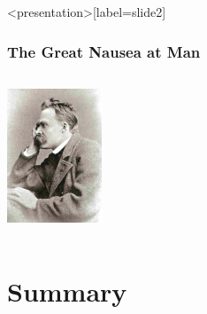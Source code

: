 \begin{frame}<presentation>[label=slide2]
    \frametitle{The Great Nausea at Man}
        \begin{columns}
            \begin{column}{3cm}
                \includegraphics[height=4cm]{../../graphics/nietzsche.jpg}
            \end{column}
            \begin{column}{7cm}
                
            \end{column}
        \end{columns}
\end{frame}

\section*{Summary}


